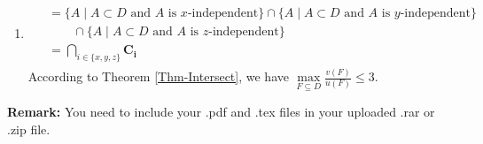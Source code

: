 \documentclass[12pt,a4paper]{article}
\makeatletter
\newtheorem*{solution}{Solution}
\theoremstyle{definition}
\renewenvironment{solution}[1][Solution] {\par\pushQED{\qed}\normalfont\topsep6\p@\@plus6\p@\relax\trivlist\item[\hskip\labelsep\bfseries#1\@addpunct{.}]\ignorespaces}{\popQED\endtrivlist\@endpefalse} \makeatother
\makeatother
\begin{document}
\begin{enumerate}
\begin{solution}
\begin{enumerate}
\begin{align}
\begin{split}
                &= \{A \mid A\subset D \text{ and } A \text{ is } x\text{-independent}\}\cap\{A \mid A\subset D \text{ and } A \text{ is } y\text{-independent}\}\\
                &\quad\quad\cap \{A \mid A\subset D \text{ and } A \text{ is } z\text{-independent}\}\\
                & = \bigcap_{i \in \{x,y,z\}}\mathbf{C_i}
            \end{split}
        \end{align}
        According to Theorem \ref{Thm-Intersect}, we have $\max\limits_{F \subseteq D} \frac{v(F)}{u(F)}\leq 3$.
    \end{enumerate}
    \end{solution}
\end{enumerate}

\vspace{20pt}

\textbf{Remark:} You need to include your .pdf and .tex files in your uploaded .rar or .zip file.

\end{document}
